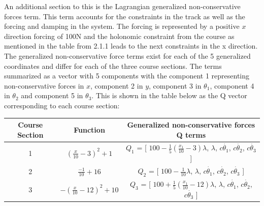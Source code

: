 \documentclass{article}
\begin{document}
An additional section to this is the Lagrangian generalized non-conservative forces term. This term accounts for the constraints in the track as well as the forcing and damping in the system. The forcing is represented by a positive $x$ direction forcing of 100N and the holonomic constraint from the course as mentioned in the table from 2.1.1 leads to the next constraints in the x direction. The generalized non-conservative force terms exist for each of the 5 generalized coordinates and differ for each of the three course sections. The terms summarized as a vector with 5 components with the component 1 representing non-conservative forces in $x$, component 2 in $y$, component 3 in $\theta_1$, component 4 in $\theta_2$ and component 5 in $\theta_3$. This is shown in the table below as the Q vector corresponding to each course section:
\begin{center}
	\begin{tabular}{c|c|c}
		Course Section& Function & Generalized non-conservative forces Q terms\\
		\hline
		1&$(\frac{x}{10}-3)^2+1$ & $Q_1$ = [ $100 - \frac{1}{5} \left( \frac{x_1}{10} - 3 \right) \lambda$, $\lambda$, $c\dot{\theta_1}$,  $c\dot{\theta_2}$,  $c\dot{\theta_3}$ ]\\
		2&$\frac{-1}{10}+16$& $Q_2$ = [ $100-\frac{1}{10} \lambda$, $\lambda$, $c\dot{\theta_1}$,  $c\dot{\theta_2}$,  $c\dot{\theta_3}$ ]\\
		3&$-(\frac{x}{10}-12)^2+10$&$Q_3$ = [ $100 + \frac{1}{5} \left( \frac{x_1}{10} - 12 \right) \lambda$, $\lambda$, $c\dot{\theta_1}$,  $c\dot{\theta_2}$,  $c\dot{\theta_3}$ ]\\
		
	\end{tabular}
\end{center}
\end{document}
